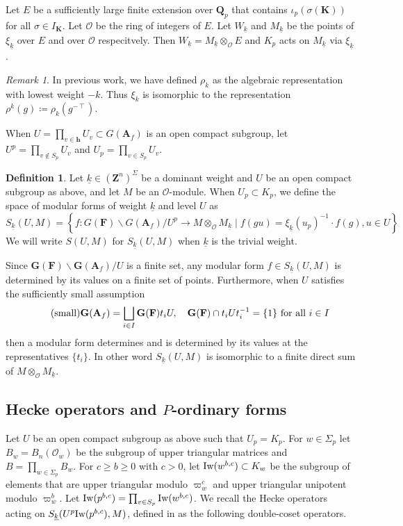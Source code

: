 \documentclass[leqno]{amsart}
\newcommand{\wt}[1]{\underline{ #1 }}
\newcommand{\GG}{\mathbf G}
\newcommand{\Iw}{\textnormal{Iw}}
\newcommand{\Z}{{\mathbf{Z}}}
\newcommand{\Qp}{\mathbf{Q}_p}
\newcommand{\A}{\mathbf A}
\newcommand{\finite}{\mathbf{h}}
\newcommand{\F}{{\mathbf{F}}} %
\newcommand{\K}{{\mathbf{K}}} %
\newcommand{\oo}{\mathcal{O}} %
\theoremstyle{definition}
\newtheorem{defn}[thm]{Definition}
\theoremstyle{remark}
\newtheorem{rem}[thm]{Remark}
\begin{document}
Let $E$ be a sufficiently large
finite extension over  $\Qp$
that contains $\iota_p(\sigma(\K))$
for all  $\sigma\in I_\K$.
Let  $\oo$ be the ring of integers of  $E$.
Let $W_{\wt{k}}$ and $M_{\wt{k}}$ 
be the points of $\xi_{\wt{k}}$ over
$E$ and over  $\oo$ respecitvely.
Then $W_{\wt{k}}=M_{\wt{k}}\otimes_{\oo}E$
and $K_p$ acts on $M_{\wt{k}}$ via $\xi_{\wt{k}}$.

\begin{rem}
	In previous work, 
	we have defined $\rho_k$ as the 
	algebraic representation with lowest weight  $-k$.
	Thus $\xi_k$ is isomorphic to the representation 
	$\rho^k(g)\coloneqq \rho_k(g^{-\intercal})$.
\end{rem}



When $U=\prod_{v\in\finite}U_v\subset G(\A_f)$
is an open compact subgroup, 
let $U^p=\prod_{v\notin S_p}U_v$ and 
$U_p=\prod_{v\in S_p}U_v$.
\begin{defn}
Let $\wt{k}\in (\Z^n)^{\Sigma}$ be a dominant weight
and $U$ be an open compact subgroup as above,
and let $M$ be an $\oo$-module.
When  $U_p\subset K_p$, we define 
the space of modular forms
of weight $\wt{k}$ and level $U$ as 
\begin{equation}
S_{\wt{k}}(U,M)=
\left\{ f: G(\F)\backslash G(\A_f)/U^p 
\rightarrow M\otimes_{\oo}M_{\wt{k}}
\mid f(gu)=\xi_{\wt{k}}(u_p)^{-1}\cdot f(g), u\in U\right\} 
\end{equation}
We will write $S(U,M)$ for $S_{\wt{k}}(U,M)$
when $\wt{k}$ is the trivial weight.
\end{defn}
Since $\GG(\F)\backslash \GG(\A_f)/U$ is a finite set,
any modular form $f\in S_{\wt{k}}(U,M)$ 
is determined by its values on a finite set of points.
Furthermore, when $U$ satisfies the 
sufficiently small assumption
\begin{equation}\label{cond:small}\tag{\text{small}}
	\GG(\A_f)=\bigsqcup_{i\in I}
	\GG(\F)t_i U,\quad
	\GG(\F)\cap t_iUt_i^{-1}=\{1\} \text{ for all } i\in I
\end{equation}
then a modular form determines and is determined by
its values at the representatives $\{t_i\}$.
In other word  $S_{\wt{k}}(U,M)$ is
isomorphic to a finite direct sum of 
$M\otimes_{\oo}M_{\wt{k}}$.

\subsection{Hecke operators and $P$-ordinary forms}

Let $U$ be an open compact subgroup as above
such that $U_p=K_p$.
For $w\in \Sigma_p$ let $B_w=B_n(\oo_w)$
be the subgroup of upper triangular matrices
and  $B=\prod_{w\in \Sigma_p}B_w$.
For $c\geq b\geq 0$ with  $c>0$, 
let $\Iw(w^{b,c})\subset K_w$
be the subgroup of elements
that are upper triangular modulo $\varpi_w^c$ and 
upper triangular unipotent modulo $\varpi_w^b$.
Let $\Iw(p^{b,c})=\prod_{v\in S_p}\Iw(w^{b,c})$.
We recall 
the Hecke operators 
acting on $S_{\wt{k}}(U^p\Iw(p^{b,c}),M)$,
defined in \cite[\S 2.3]{ger}
as the following double-coset operators.
\end{document}
